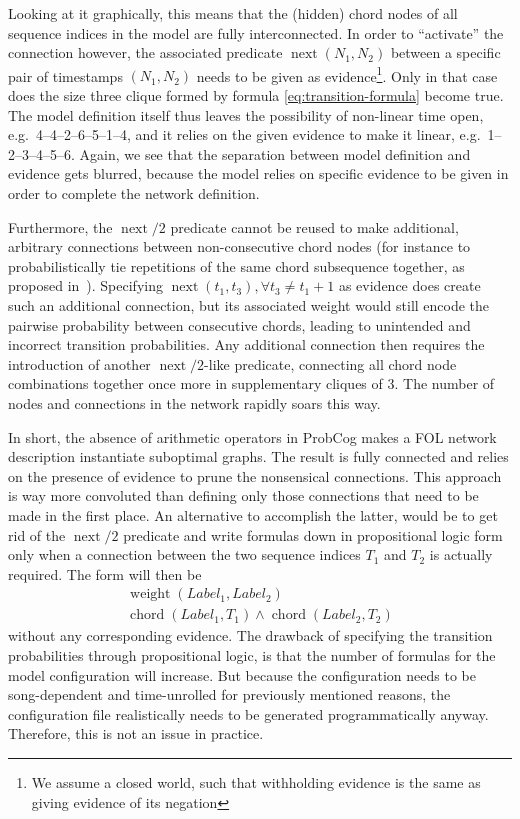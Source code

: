 \documentclass[letterpaper]{article} %
\begin{document}
Looking at it graphically, this means that the (hidden) chord nodes of all sequence indices in the model are fully interconnected. In order to ``activate'' the connection however, the associated predicate $\operatorname{next}\left(N_1,N_2\right)$ between a specific pair of timestamps $\left(N_1,N_2\right)$ needs to be given as evidence\footnote{We assume a closed world, such that withholding evidence is the same as giving evidence of its negation}. Only in that case does the size three clique formed by formula \eqref{eq:transition-formula} become true.
The model definition itself thus leaves the possibility of non-linear time open, e.g.\ 4--4--2--6--5--1--4, and it relies on the given evidence to make it linear, e.g.\ 1--2--3--4--5--6. Again, we see that the separation between model definition and evidence gets blurred, because the model relies on specific evidence to be given in order to complete the network definition.

Furthermore, the $\operatorname{next}/2$ predicate cannot be reused to make additional, arbitrary connections between non-consecutive chord nodes (for instance to probabilistically tie repetitions of the same chord subsequence together, as proposed in~\cite{papadopoulos2013icassp}). Specifying $\operatorname{next}\left(t_1,t_3\right),\forall t_3\neq t_1+1$ as evidence does create such an additional connection, but its associated weight would still encode the pairwise probability between consecutive chords, leading to unintended and incorrect transition probabilities. Any additional connection then requires the introduction of another $\operatorname{next}/2$-like predicate, connecting all chord node combinations together once more in supplementary cliques of 3. The number of nodes and connections in the network rapidly soars this way.

In short, the absence of arithmetic operators in ProbCog makes a FOL network description instantiate suboptimal graphs. The result is fully connected and relies on the presence of evidence to prune the nonsensical connections. This approach is way more convoluted than defining only those connections that need to be made in the first place. An alternative to accomplish the latter, would be to get rid of the $\operatorname{next}/2$ predicate and write formulas down in propositional logic form only when a connection between the two sequence indices $T_1$ and $T_2$ is actually required. The form will then be
\begin{multline}
\operatorname{weight}\left(Label_1,Label_2\right) \\ \operatorname{chord}\left(Label_1, T_1\right) \wedge \operatorname{chord}\left(Label_2, T_2\right)
\end{multline}
without any corresponding evidence. The drawback of specifying the transition probabilities through propositional logic, is that the number of formulas for the model configuration will increase. But because the configuration needs to be song-dependent and time-unrolled for previously mentioned reasons, the configuration file realistically needs to be generated programmatically anyway. Therefore, this is not an issue in practice.
\end{document}
